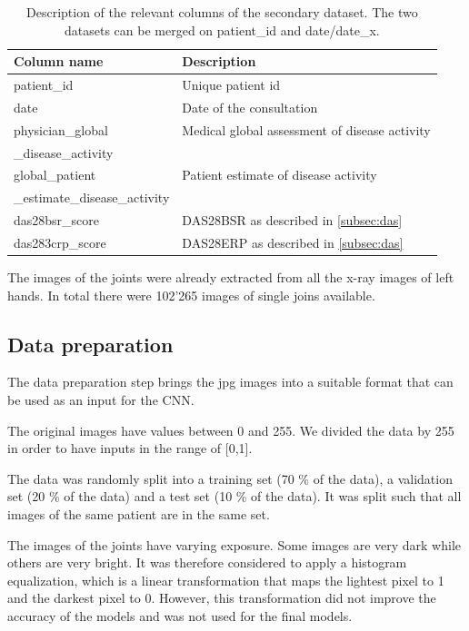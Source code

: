\documentclass[12pt]{article}
\begin{document}
\begin{table}[ht]
\centering
\caption{Description of the relevant columns of the secondary dataset. The two datasets can be merged on patient\_id and date/date\_x.}
\label{tab:sec_dataset}
\begin{tabular}{@{}ll@{}}
\toprule
Column name   & Description                                           \\ \midrule
patient\_id   & Unique patient id                                     \\
date       & Date of the consultation                              \\
physician\_global & Medical global assessment of disease activity\\
\_disease\_activity    \\   
global\_patient & Patient estimate of disease activity   \\
\_estimate\_disease\_activity    \\ 
das28bsr\_score    & DAS28BSR as described in \autoref{subsec:das}             \\
das283crp\_score & DAS28ERP as described in \autoref{subsec:das} \\ \bottomrule
\end{tabular}
\end{table}


The images of the joints were already extracted from all the x-ray images of left hands. In total there were 102'265 images of single joins available.


\subsection{Data preparation}
\label{subsec:data_prep}

The data preparation step brings the jpg images into a suitable format that can be used as an input for the CNN. 

The original images have values between 0 and 255. We divided the data by 255 in order to have inputs in the range of [0,1].

The data was randomly split into a training set (70 \% of the data), a validation set (20 \% of the data) and a test set (10 \% of the data). It was split such that all images of the same patient are in the same set.

The images of the joints have varying exposure. Some images are very dark while others are very bright. It was therefore considered to apply a histogram equalization, which is a linear transformation that maps the lightest pixel to 1 and the darkest pixel to 0. However, this transformation did not improve the accuracy of the models and was not used for the final models.
\end{document}
